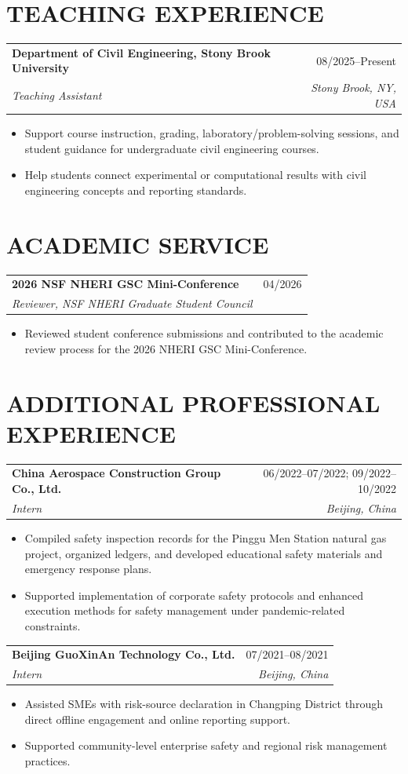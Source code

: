 \documentclass[10pt,letterpaper]{article}
\makeatletter
\newcommand{\cvsubheading}[4]{%
  \begin{tabularx}{\textwidth}{@{}X r@{}}
    \textbf{#1} & #3 \\
    \textit{#2} & \textit{#4} \\
  \end{tabularx}\vspace{-3pt}
}
\makeatother
\begin{document}
\newpage
\section*{TEACHING EXPERIENCE}
\cvsubheading{Department of Civil Engineering, Stony Brook University}{Teaching Assistant}{08/2025--Present}{Stony Brook, NY, USA}
\begin{itemize}
    \item Support course instruction, grading, laboratory/problem-solving sessions, and student guidance for undergraduate civil engineering courses.
    \item Help students connect experimental or computational results with civil engineering concepts and reporting standards.
\end{itemize}

\section*{ACADEMIC SERVICE}
\cvsubheading{2026 NSF NHERI GSC Mini-Conference}{Reviewer, NSF NHERI Graduate Student Council}{04/2026}{}
\begin{itemize}
    \item Reviewed student conference submissions and contributed to the academic review process for the 2026 NHERI GSC Mini-Conference.
\end{itemize}

\section*{ADDITIONAL PROFESSIONAL EXPERIENCE}
\cvsubheading{China Aerospace Construction Group Co., Ltd.}{Intern}{06/2022--07/2022; 09/2022--10/2022}{Beijing, China}
\begin{itemize}
    \item Compiled safety inspection records for the Pinggu Men Station natural gas project, organized ledgers, and developed educational safety materials and emergency response plans.
    \item Supported implementation of corporate safety protocols and enhanced execution methods for safety management under pandemic-related constraints.
\end{itemize}

\cvsubheading{Beijing GuoXinAn Technology Co., Ltd.}{Intern}{07/2021--08/2021}{Beijing, China}
\begin{itemize}
    \item Assisted SMEs with risk-source declaration in Changping District through direct offline engagement and online reporting support.
    \item Supported community-level enterprise safety and regional risk management practices.
\end{itemize}
\end{document}
